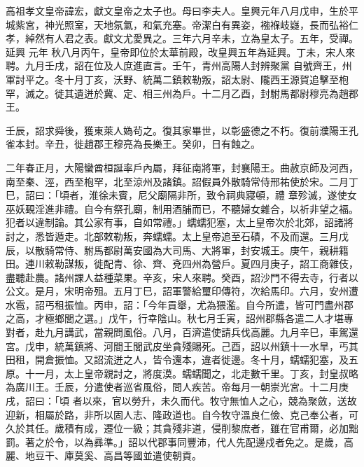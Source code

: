 
\begin{pinyinscope}

 高祖孝文皇帝諱宏，獻文皇帝之太子也。母曰李夫人。皇興元年八月戊申，生於平城紫宮，神光照室，天地氛氳，和氣充塞。帝潔白有異姿，襁褓岐嶷，長而弘裕仁孝，綽然有人君之表。獻文尤愛異之。三年六月辛未，立為皇太子。五年，受禪。延興
 元年
 秋八月丙午，皇帝即位於太華前殿，改皇興五年為延興。丁未，宋人來聘。九月壬戌，詔在位及人庶進直言。壬午，青州高陽人封辨聚黨
 自號齊王，州軍討平之。冬十月丁亥，沃野、統萬二鎮敕勒叛，詔太尉、隴西王源賀追擊至枹罕，滅之。徙其遺迸於冀、定、相三州為戶。十二月乙酉，封駙馬都尉穆亮為趙郡王。



 壬辰，詔求舜後，獲東萊人媯茍之。復其家畢世，以彰盛德之不朽。復前濮陽王孔雀本封。辛丑，徙趙郡王穆亮為長樂王。癸卯，日有蝕之。



 二年春正月，大陽蠻酋桓誕率戶內屬，拜征南將軍，封襄陽王。曲赦京師及河西，南至秦、涇，西至枹罕，北至涼州及諸鎮。詔假員外散騎常侍邢祐使於宋。二月丁巳，詔曰：「頃者，淮徐未賓，尼父廟隔非所，致令祠典寢頓，禮
 章殄滅，遂使女巫妖覡淫進非禮。自今有祭孔廟，制用酒脯而已，不聽婦女雜合，以祈非望之福。犯者以違制論。其公家有事，自如常禮。」蠕蠕犯塞，太上皇帝次於北郊，詔諸將討之，悉皆遁走。北部敕勒叛，奔蠕蠕。太上皇帝追至石磧，不及而還。三月戊辰，以散騎常侍、駙馬都尉萬安國為大司馬、大將軍，封安城王。庚午，親耕籍田。連川敕勒謀叛，徙配青、徐、齊、兗四州為營戶。夏四月庚子，詔工商雜伎，盡聽赴農。諸州課人益種菜果。辛亥，宋人來聘。癸酉，詔沙門不得去寺，行者以公文。是月，宋明帝殂。五月丁巳，詔軍警給璽印傳符，次給馬印。六月，安州遭
 水雹，詔丐租振恤。丙申，詔：「今年貢舉，尤為猥濫。自今所遣，皆可門盡州郡之高，才極鄉閭之選。」戊午，行幸陰山。秋七月壬寅，詔州郡縣各遣二人才堪專對者，赴九月講武，當親問風俗。八月，百濟遣使請兵伐高麗。九月辛巳，車駕還宮。戊申，統萬鎮將、河間王閭武皮坐貪殘賜死。己酉，詔以州鎮十一水旱，丐其田租，開倉振恤。又詔流迸之人，皆令還本，違者徙邊。冬十月，蠕蠕犯塞，及五原。十一月，太上皇帝親討之，將度漠。蠕蠕聞之，北走數千里。丁亥，封皇叔略為廣川王。壬辰，分遣使者巡省風俗，問人疾苦。帝每月一朝崇光宮。十二月庚戌，詔曰：「頃
 者以來，官以勞升，未久而代。牧守無恤人之心，競為聚斂，送故迎新，相屬於路，非所以固人志、隆政道也。自今牧守溫良仁儉、克己奉公者，可久於其任。歲積有成，遷位一級；其貪殘非道，侵削黎庶者，雖在官甫爾，必加黜罰。著之於令，以為彞準。」詔以代郡事同豐沛，代人先配邊戍者免之。是歲，高麗、地豆干、庫莫奚、高昌等國並遣使朝貢。




\end{pinyinscope}
